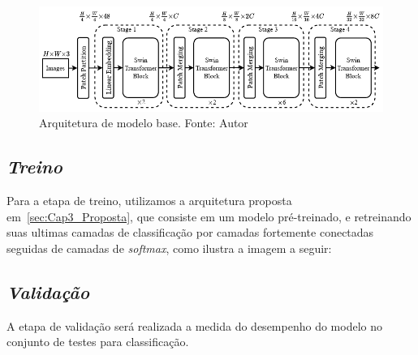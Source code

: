 \begin{figure}[!ht]
    \centering
    \includegraphics[width=0.9\columnwidth]{Imagens/arquitetura swin.png}
    \caption{ Arquitetura de modelo base.
    Fonte: Autor}
   \label{fig:ResNet-Rsp}
\end{figure}




\subsection{\textit{Treino}}\label{sec:Cap3_Treino}

Para a etapa de treino, utilizamos a arquitetura proposta em~\ref{sec:Cap3_Proposta}, que consiste em um modelo pré-treinado, e retreinando suas ultimas camadas de classificação por camadas fortemente conectadas seguidas de camadas de \textit{softmax}, como ilustra a imagem a seguir:


\subsection{\textit{Validação}}\label{sec:Cap3_Validacao}

A etapa de validação será realizada a medida do desempenho do modelo no conjunto de testes para classificação.

